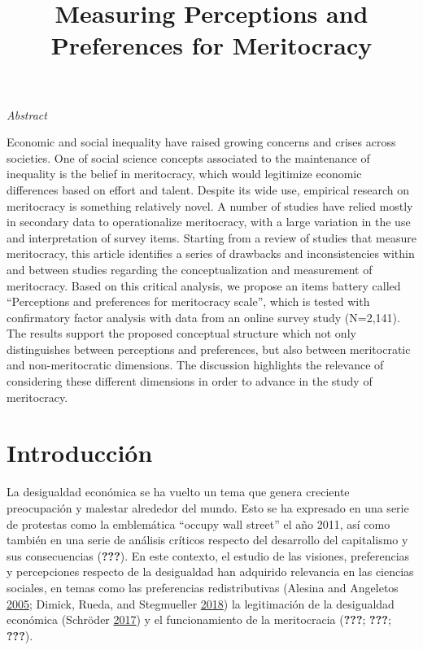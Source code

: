 \documentclass[
]{article}
\title{Measuring Perceptions and Preferences for Meritocracy}
\author{}
\date{\vspace{-2.5em}}
\begin{document}
\maketitle

\emph{Abstract}

Economic and social inequality have raised growing concerns and crises
across societies. One of social science concepts associated to the
maintenance of inequality is the belief in meritocracy, which would
legitimize economic differences based on effort and talent. Despite its
wide use, empirical research on meritocracy is something relatively
novel. A number of studies have relied mostly in secondary data to
operationalize meritocracy, with a large variation in the use and
interpretation of survey items. Starting from a review of studies that
measure meritocracy, this article identifies a series of drawbacks and
inconsistencies within and between studies regarding the
conceptualization and measurement of meritocracy. Based on this critical
analysis, we propose an items battery called ``Perceptions and
preferences for meritocracy scale'', which is tested with confirmatory
factor analysis with data from an online survey study (N=2,141). The
results support the proposed conceptual structure which not only
distinguishes between perceptions and preferences, but also between
meritocratic and non-meritocratic dimensions. The discussion highlights
the relevance of considering these different dimensions in order to
advance in the study of meritocracy.

\hypertarget{introducciuxf3n}{%
\section{Introducción}\label{introducciuxf3n}}

La desigualdad económica se ha vuelto un tema que genera creciente
preocupación y malestar alrededor del mundo. Esto se ha expresado en una
serie de protestas como la emblemática ``occupy wall street'' el año
2011, así como también en una serie de análisis críticos respecto del
desarrollo del capitalismo y sus consecuencias ({\textbf{???}}). En este
contexto, el estudio de las visiones, preferencias y percepciones
respecto de la desigualdad han adquirido relevancia en las ciencias
sociales, en temas como las preferencias redistributivas (Alesina and
Angeletos \protect\hyperlink{ref-alesina_Fairness_2005}{2005}; Dimick,
Rueda, and Stegmueller \protect\hyperlink{ref-dimick_Models_2018}{2018})
la legitimación de la desigualdad económica (Schröder
\protect\hyperlink{ref-schroder_Income_2017}{2017}) y el funcionamiento
de la meritocracia ({\textbf{???}}; {\textbf{???}}; {\textbf{???}}).
\end{document}
